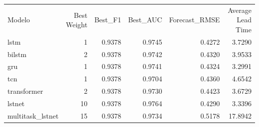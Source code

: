 \begin{tabular}{lrrrrr}
Modelo & Best Weight & Best_F1 & Best_AUC & Forecast_RMSE & Average Lead Time \\
lstm & 1 & 0.9378 & 0.9745 & 0.4272 & 3.7290 \\
bilstm & 2 & 0.9378 & 0.9742 & 0.4320 & 3.9533 \\
gru & 1 & 0.9378 & 0.9741 & 0.4324 & 3.2991 \\
tcn & 1 & 0.9378 & 0.9704 & 0.4360 & 4.6542 \\
transformer & 2 & 0.9378 & 0.9730 & 0.4423 & 3.6729 \\
lstnet & 10 & 0.9378 & 0.9764 & 0.4290 & 3.3396 \\
multitask_lstnet & 15 & 0.9378 & 0.9734 & 0.5178 & 17.8942 \\
\end{tabular}
